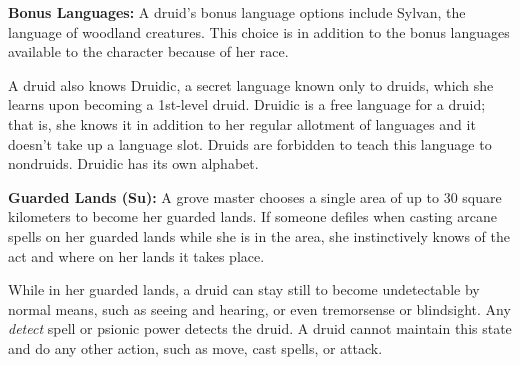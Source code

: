 \textbf{Bonus Languages:} A druid's bonus language options include Sylvan, the language of woodland creatures. This choice is in addition to the bonus languages available to the character because of her race.

A druid also knows Druidic, a secret language known only to druids, which she learns upon becoming a 1st-level druid. Druidic is a free language for a druid; that is, she knows it in addition to her regular allotment of languages and it doesn't take up a language slot. Druids are forbidden to teach this language to nondruids. Druidic has its own alphabet.




\textbf{Guarded Lands (Su):} A grove master chooses a single area of up to 30 square kilometers to become her guarded lands. If someone defiles when casting arcane spells on her guarded lands while she is in the area, she instinctively knows of the act and where on her lands it takes place.

While in her guarded lands, a druid can stay still to become undetectable by normal means, such as seeing and hearing, or even tremorsense or blindsight. Any \emph{detect} spell or psionic power detects the druid. A druid cannot maintain this state and do any other action, such as move, cast spells, or attack.

